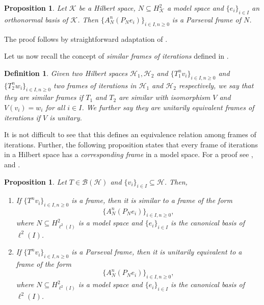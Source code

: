 \documentclass[a4paper,12pt]{amsart}
\def\cB{{\mathcal{B}}}
\def\HH{{\mathcal{H}}}
\def\KK{{\mathcal{K}}}
\newtheorem{proposition}[theorem]{Proposition}
\newtheorem{definition}[theorem]{Definition}
\theoremstyle{definition}
\begin{document}
\begin{proposition}\label{basicparseval}
Let $\KK$ be a Hilbert space, $N\subseteq H^2_\KK$ a model space and $\{e_i\}_{i\in I}$ an orthonormal basis of $\KK$. Then $\{A_N^n(P_Ne_i)\}_{i\in I,n\geqslant0}$ is a Parseval frame of $N$.
\end{proposition}

The proof follows by straightforward adaptation of {\cite[Proposition $3.6$]{ACCP}}.

Let us now recall the concept of {\em similar  frames of iterations } defined in \cite[$\S$3]{ACCP}. 
\begin{definition}\label{def-similar-frames}
Given two Hilbert spaces $\HH_1,\HH_2$  and $\{T_1^nv_i\}_{i\in I,n\geqslant0}$ and $\{T_2^nw_i\}_{i\in I,n\geqslant0}$ two frames of iterations in $\HH_1$ and $\HH_2$ respectively, we say that they are similar frames if $T_1$ and $T_2$ are similar with isomorphism $V$ and $V(v_i)=w_i$ for all $i\in I$. We further say they are  unitarily equivalent frames of iterations if $V$ is unitary.
\end{definition}


It is not difficult to see that this defines an equivalence relation among frames of iterations. Further, the following proposition states that every frame of iterations in a Hilbert space has a \textit{corresponding frame} in a model space. For a proof see \cite[Theorem 2.1]{CMS}, \cite[Theorem 3.4]{CHP} and \cite[Theorem $3.9$]{ACCP}.

\begin{proposition}\label{basic}
Let $T\in\cB(\HH)$ and $\{v_i\}_{i\in I}\subseteq\HH$. Then,
\begin{enumerate}[label=(\roman*),ref=(\roman*)]
\item If $\{T^nv_i\}_{i\in I,n\geqslant0}$ is a frame, then it is similar to a frame of the form\begin{equation*}
\{A_N^n(P_Ne_i)\}_{i\in I,n\geqslant0},
\end{equation*}
where $N\subseteq H^2_{\ell^2(I)}$ is a model space and $\{e_i\}_{i\in I}$ is the canonical basis of $\ell^2(I)$.

\item If $\{T^nv_i\}_{i\in I,n\geqslant0}$ is a Parseval frame, then it is unitarily equivalent to a frame of the form
\begin{equation*}
\{A_N^n(P_Ne_i)\}_{i\in I,n\geqslant0},
\end{equation*}
where $N\subseteq H^2_{\ell^2(I)}$ is a model space and $\{e_i\}_{i\in I}$ is the canonical basis of $\ell^2(I)$.
\end{enumerate}
\end{proposition}
\end{document}
